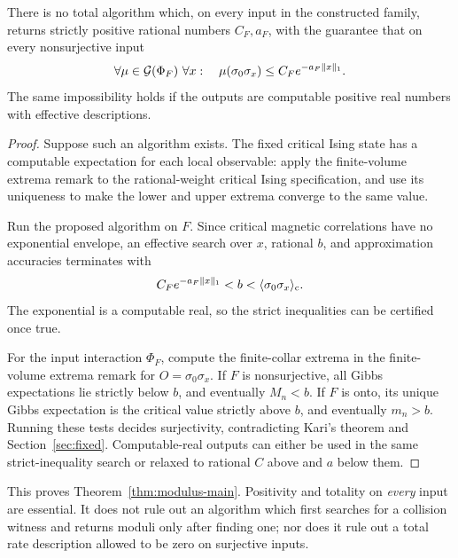 \begin{proposition}\label{prop:modulus}
There is no total algorithm which, on every input in the constructed family, returns strictly positive rational numbers \(C_F,a_F\), with the guarantee that on every nonsurjective input
\begin{equation}
 \forall\mu\in\mathcal G(\Phi_F)\ \forall x:\quad
 \mu(\sigma_0\sigma_x)\le C_F e^{-a_F\|x\|_1}.
\end{equation}
The same impossibility holds if the outputs are computable positive real numbers with effective descriptions.
\end{proposition}
\begin{proof}
Suppose such an algorithm exists. The fixed critical Ising state has a computable expectation for each local observable: apply the finite-volume extrema remark to the rational-weight critical Ising specification, and use its uniqueness to make the lower and upper extrema converge to the same value.

Run the proposed algorithm on \(F\). Since critical magnetic correlations have no exponential envelope, an effective search over \(x\), rational \(b\), and approximation accuracies terminates with
\begin{equation}
 C_F e^{-a_F\|x\|_1}<b<
 \langle\sigma_0\sigma_x\rangle_{\mathrm c}.
\end{equation}
The exponential is a computable real, so the strict inequalities can be certified once true.

For the input interaction \(\Phi_F\), compute the finite-collar extrema in the finite-volume extrema remark for \(O=\sigma_0\sigma_x\). If \(F\) is nonsurjective, all Gibbs expectations lie strictly below \(b\), and eventually \(M_n<b\). If \(F\) is onto, its unique Gibbs expectation is the critical value strictly above \(b\), and eventually \(m_n>b\). Running these tests decides surjectivity, contradicting Kari's theorem and Section~\ref{sec:fixed}. Computable-real outputs can either be used in the same strict-inequality search or relaxed to rational \(C\) above and \(a\) below them.
\end{proof}

This proves Theorem~\ref{thm:modulus-main}. Positivity and totality on \emph{every} input are essential. It does not rule out an algorithm which first searches for a collision witness and returns moduli only after finding one; nor does it rule out a total rate description allowed to be zero on surjective inputs.

